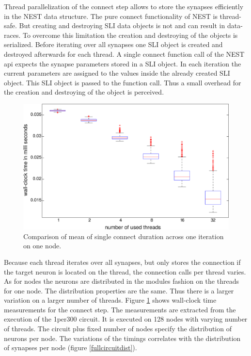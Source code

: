 Thread parallelization of the connect step allows to store the synapses efficiently in the NEST data structure.
The pure connect functionality of NEST is thread-safe. But creating and destroying SLI data objects is not and can result
in data-races. To overcome this limitation the creation and destroying of the objects is serialized. Before iterating over all synapses one SLI object is created and destroyed afterwards for each thread. A single connect function
call of the NEST api expects the synapse parameters stored in a SLI object. In each iteration the current
parameters are assigned to the values inside the already created SLI object. This SLI object is passed to the function call.
Thus a small overhead for the creation and destroying of the object is perceived.
\begin{figure}[ht!]
\centering
\includegraphics[scale=0.3]{pictures/boxplot_new_con_dt_1_300_edit.eps}
\caption{Comparison of mean of single connect duration across one iteration on one node.}
\label{boxplotnewcon}
\end{figure}
Because each thread iterates over all synapses, but only stores the connection if the target neuron is located on
the thread, the connection calls per thread varies.
As for nodes the neurons are distributed in the modules fashion on the threads for one node.
The distribution properties are the same. Thus there is a larger variation on a larger number of threads.
Figure \ref{boxplotnewcon} shows wall-clock time measurements for the connect step. The measurements are
extracted from the execution of the 1per300 circuit. It is executed on 128 nodes with varying number of
threads. The circuit plus fixed number of nodes specify the distribution of neurons per node.
The variations of the timings correlates with the distribution of synapses per node (figure \ref{fullcircuitdist}).
